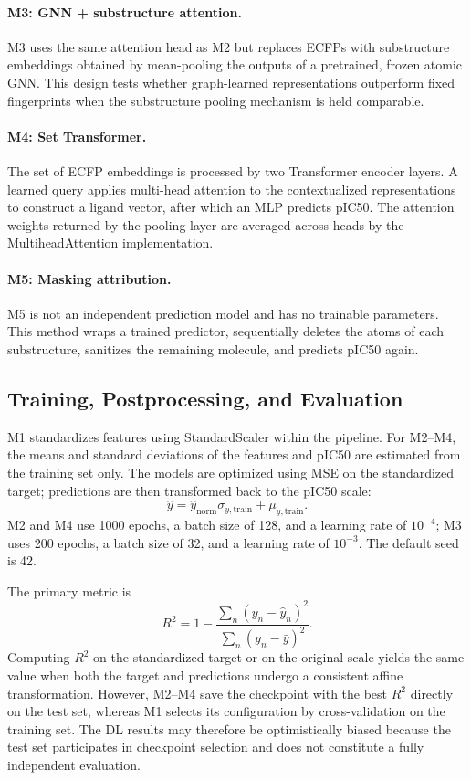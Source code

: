 \paragraph{M3: GNN + substructure attention.}
M3 uses the same attention head as M2 but replaces ECFPs with substructure
embeddings obtained by mean-pooling the outputs of a pretrained, frozen atomic
GNN. This design tests whether graph-learned representations outperform fixed
fingerprints when the substructure pooling mechanism is held comparable.

\paragraph{M4: Set Transformer.}
The set of ECFP embeddings is processed by two Transformer encoder layers. A
learned query applies multi-head attention to the contextualized representations
to construct a ligand vector, after which an MLP predicts pIC50. The attention
weights returned by the pooling layer are averaged across heads by the
MultiheadAttention implementation.

\paragraph{M5: Masking attribution.}
M5 is not an independent prediction model and has no trainable parameters. This
method wraps a trained predictor, sequentially deletes the atoms of each
substructure, sanitizes the remaining molecule, and predicts pIC50 again.

\subsection{Training, Postprocessing, and Evaluation}

M1 standardizes features using StandardScaler within the pipeline. For M2--M4,
the means and standard deviations of the features and pIC50 are estimated from
the training set only. The models are optimized using MSE on the standardized
target; predictions are then transformed back to the pIC50 scale:
\begin{equation}
    \widehat{y} =
    \widehat{y}_{\mathrm{norm}}\sigma_{y,\mathrm{train}}
    +\mu_{y,\mathrm{train}}.
\end{equation}
M2 and M4 use 1000 epochs, a batch size of 128, and a learning rate of
\(10^{-4}\); M3 uses 200 epochs, a batch size of 32, and a learning rate of
\(10^{-3}\). The default seed is 42.

The primary metric is
\begin{equation}
    R^2=1-\frac{\sum_n(y_n-\widehat{y}_n)^2}
    {\sum_n(y_n-\bar{y})^2}.
\end{equation}
Computing \(R^2\) on the standardized target or on the original scale yields the
same value when both the target and predictions undergo a consistent affine
transformation. However, M2--M4 save the checkpoint with the best \(R^2\)
directly on the test set, whereas M1 selects its configuration by
cross-validation on the training set. The DL results may therefore be
optimistically biased because the test set participates in checkpoint selection
and does not constitute a fully independent evaluation.

